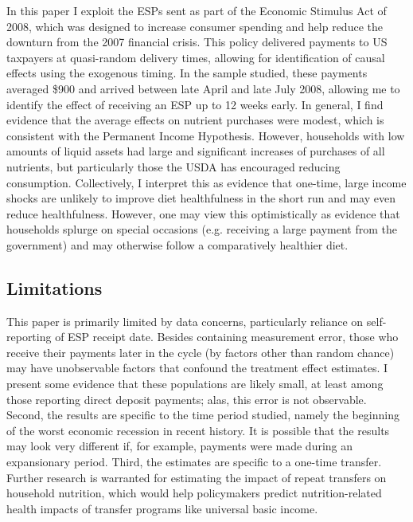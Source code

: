 \documentclass[12pt]{article}
\begin{document}
In this paper I exploit the ESPs sent as part of the Economic Stimulus Act of 2008, which was designed to increase consumer spending and help reduce the downturn from the 2007 financial crisis.
This policy delivered payments to US taxpayers at quasi-random delivery times, allowing for identification of causal effects using the exogenous timing.
In the sample studied, these payments averaged \$900 and arrived between late April and late July 2008, allowing me to identify the effect of receiving an ESP up to 12 weeks early.
In general, I find evidence that the average effects on nutrient purchases were modest, which is consistent with the Permanent Income Hypothesis.
However, households with low amounts of liquid assets had large and significant increases of purchases of all nutrients, but particularly those the USDA has encouraged reducing consumption.
Collectively, I interpret this as evidence that one-time, large income shocks are unlikely to improve diet healthfulness in the short run and may even reduce healthfulness.
However, one may view this optimistically as evidence that households splurge on special occasions (e.g. receiving a large payment from the government) and may otherwise follow a comparatively healthier diet.

\subsection{Limitations}

This paper is primarily limited by data concerns, particularly reliance on self-reporting of ESP receipt date.
Besides containing measurement error, those who receive their payments later in the cycle (by factors other than random chance) may have unobservable factors that confound the treatment effect estimates.
I present some evidence that these populations are likely small, at least among those reporting direct deposit payments; alas, this error is not observable.
Second, the results are specific to the time period studied, namely the beginning of the worst economic recession in recent history.
It is possible that the results may look very different if, for example, payments were made during an expansionary period.
Third, the estimates are specific to a one-time transfer.
Further research is warranted for estimating the impact of repeat transfers on household nutrition, which would help policymakers predict nutrition-related health impacts of transfer programs like universal basic income.


\clearpage
\printbibliography
\end{document}
